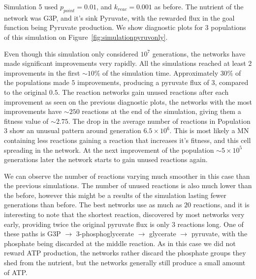 \documentclass[a4paper,12pt]{article}
\begin{document}
Simulation 5 used $p_{point}=0.01$, and $k_{reac}=0.001$ as before. The nutrient of the network was G3P, and it's sink Pyruvate, with the rewarded flux in the goal function being Pyruvate production. We show diagnostic plots for $3$ populations of this simulation on Figure~\ref{fig:simulationpyruvonly}.

Even though this simulation only considered $10^7$ generations, the networks have made significant improvements very rapidly. All the simulations reached at least $2$ improvements in the first $\sim 10\%$ of the simulation time. Approximately $30\%$ of the populations made $5$ improvements, producing a pyruvate flux of $3$, compared to the original $0.5$. The reaction networks gain unused reactions after each improvement as seen on the previous diagnostic plots, the networks with the most improvements have $\sim 250$ reactions at the end of the simulation, giving them a fitness value of $\sim 2.75$. The drop in the average number of reactions in Population 3 show an unusual pattern around generation $6.5\times 10^6$. This is most likely a MN containing less reactions gaining a reaction that increases it's fitness, and this cell spreading in the network. At the next improvement of the population $\sim 5\times10^5$ generations later the network starts to gain unused reactions again. 

We can observe the number of reactions varying much smoother in this case than the previous simulations. The number of unused reactions is also much lower than the before, however this might be a results of the simulation lasting fewer generations than before.  The best networks use as much as $20$ reactions, and it is interesting to note that the shortest reaction, discovered by most networks very early, providing twice the original pyruvate flux is only $3$ reactions long. One of these paths is G3P $\rightarrow$ 3-phosphoglycerate $\rightarrow$ glycerate $\rightarrow$ pyruvate, with the phosphate being discarded at the middle reaction. 
As in this case we did not reward ATP production, the networks rather discard the phosphate groups they shed from the nutrient, but the networks generally still produce a small amount of ATP. 
\end{document}
